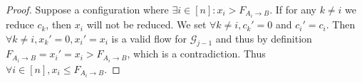 \begin{proof}
   Suppose a configuration where $\exists i \in [n] : x_i > F_{A_i \rightarrow B}$. If for any $k \neq i$ we reduce $c_k$, then
   $x_i$ will not be reduced. We set $\forall k \neq i, c_k' = 0$ and $c_i' = c_i$. Then $\forall k \neq i, x_k' = 0, 
   x_i' = x_i$ is a valid flow for $\mathcal{G}_{j-1}$ and thus by definition $F_{A_i \rightarrow B} = x_i' = x_i >
   F_{A_i \rightarrow B}$, which is a contradiction. Thus $\forall i \in [n], x_i \leq F_{A_i \rightarrow B}$.
\end{proof}
